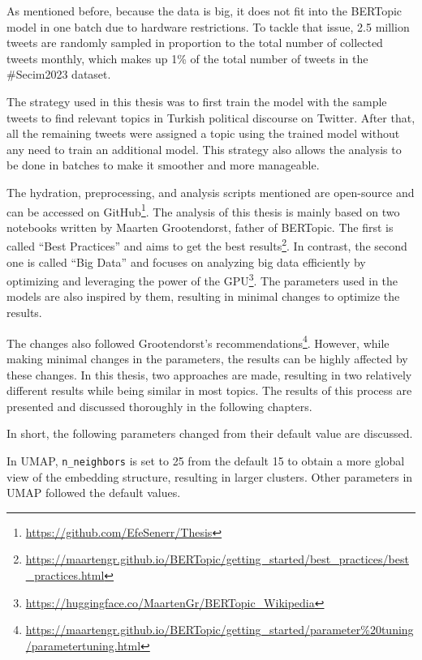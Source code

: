 As mentioned before, because the data is big, it does not fit into the BERTopic model 
in one batch due to hardware restrictions. To tackle that issue, 2.5 million tweets are 
randomly sampled in proportion to the total number of collected tweets monthly, which 
makes up 1\% of the total number of tweets in the \#Secim2023 dataset. 

The strategy used in this thesis was to first train the model with the sample tweets to 
find relevant topics in Turkish political discourse on Twitter. After that, all the 
remaining tweets were assigned a topic using the trained model without any need to train 
an additional model. This strategy also allows the analysis to be done in batches to make 
it smoother and more manageable.

The hydration, preprocessing, and analysis scripts mentioned are open-source and can be 
accessed on GitHub\footnote{\url{https://github.com/EfeSenerr/Thesis}}. The analysis of 
this thesis is mainly based on two notebooks written by Maarten Grootendorst, father of 
BERTopic. The first is called ``Best Practices''
and aims to get the best results\footnote{\url{https://maartengr.github.io/BERTopic/getting_started/best_practices/best_practices.html}}. 
In contrast, the second one is called ``Big Data'' 
and focuses on analyzing big data efficiently by optimizing and leveraging the power of the 
GPU\footnote{\url{https://huggingface.co/MaartenGr/BERTopic_Wikipedia}}. 
The parameters used in the models are also inspired by them, resulting in minimal changes 
to optimize the results. 

The changes also followed Grootendorst's 
recommendations\footnote{\url{https://maartengr.github.io/BERTopic/getting_started/parameter\%20tuning/parametertuning.html}}.
However, while making minimal changes in the parameters, the results can be highly affected 
by these changes. In this thesis, two approaches are made, resulting in two relatively 
different results while being similar in most topics. The results of this process are 
presented and discussed thoroughly in the following chapters.

In short, the following parameters changed from their default value are discussed. 

In UMAP, \texttt{n\_neighbors} is set to 25 from the default 15 to obtain a more global view of 
the embedding structure, resulting in larger clusters. Other parameters in UMAP followed 
the default values.

